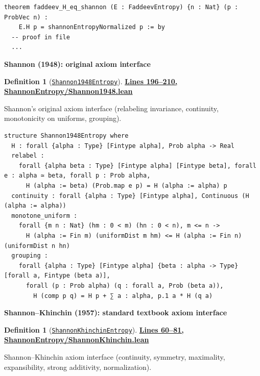 \documentclass[11pt]{article}
\theoremstyle{definition}
\newtheorem{definition}[theorem]{Definition}
\theoremstyle{remark}
\begin{document}
\begin{lstlisting}[caption={Faddeev uniqueness theorem (main result)}]
theorem faddeev_H_eq_shannon (E : FaddeevEntropy) {n : Nat} (p : ProbVec n) :
    E.H p = shannonEntropyNormalized p := by
  -- proof in file
  ...
\end{lstlisting}

\textbf{Shannon (1948): original axiom interface}

\begin{definition}[\href{https://github.com/zariuq/ks-foundations-of-inference/blob/main/InformationTheory/ShannonEntropy/Shannon1948.lean\#L196}{\texttt{Shannon1948Entropy}}]
\textbf{\href{https://github.com/zariuq/ks-foundations-of-inference/blob/main/InformationTheory/ShannonEntropy/Shannon1948.lean\#L196-L210}{Lines 196--210, ShannonEntropy/Shannon1948.lean}}

Shannon's original axiom interface (relabeling invariance, continuity, monotonicity on uniforms, grouping).
\end{definition}

\begin{lstlisting}[caption={Shannon 1948 axiom interface}]
structure Shannon1948Entropy where
  H : forall {alpha : Type} [Fintype alpha], Prob alpha -> Real
  relabel :
    forall {alpha beta : Type} [Fintype alpha] [Fintype beta], forall e : alpha ≃ beta, forall p : Prob alpha,
      H (alpha := beta) (Prob.map e p) = H (alpha := alpha) p
  continuity : forall {alpha : Type} [Fintype alpha], Continuous (H (alpha := alpha))
  monotone_uniform :
    forall {m n : Nat} (hm : 0 < m) (hn : 0 < n), m <= n ->
      H (alpha := Fin m) (uniformDist m hm) <= H (alpha := Fin n) (uniformDist n hn)
  grouping :
    forall {alpha : Type} [Fintype alpha] {beta : alpha -> Type} [forall a, Fintype (beta a)],
      forall (p : Prob alpha) (q : forall a, Prob (beta a)),
        H (comp p q) = H p + ∑ a : alpha, p.1 a * H (q a)
\end{lstlisting}

\textbf{Shannon--Khinchin (1957): standard textbook axiom interface}

\begin{definition}[\href{https://github.com/zariuq/ks-foundations-of-inference/blob/main/InformationTheory/ShannonEntropy/ShannonKhinchin.lean\#L60}{\texttt{ShannonKhinchinEntropy}}]
\textbf{\href{https://github.com/zariuq/ks-foundations-of-inference/blob/main/InformationTheory/ShannonEntropy/ShannonKhinchin.lean\#L60-L81}{Lines 60--81, ShannonEntropy/ShannonKhinchin.lean}}

Shannon--Khinchin axiom interface (continuity, symmetry, maximality, expansibility, strong additivity, normalization).
\end{definition}
\end{document}
